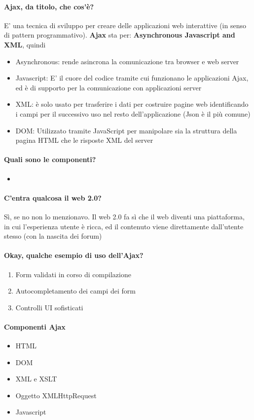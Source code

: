 \documentclass[12pt, a4paper, openany, twoside]{book}
\begin{document}
\paragraph{Ajax, da titolo, che cos'è?} E' una tecnica di sviluppo per creare
delle applicazioni web interattive (in senso di pattern programmativo).
\textbf{Ajax} sta per: \textbf{Asynchronous Javascript and XML}, quindi
\begin{itemize}
	\item Asynchronous: rende asincrona la comunicazione tra browser e web server
	\item Javascript: E' il cuore del codice tramite cui funzionano le applicazioni
	Ajax, ed è di supporto per la comunicazione con applicazioni server
	\item XML: è solo usato per trasferire i dati per costruire pagine web identificando
	i campi per il successivo uso nel resto dell'applicazione (Json è il più
	comune)
	\item DOM: Utilizzato tramite JavaScript per manipolare sia la struttura della 
	pagina HTML che le risposte XML del server
\end{itemize}
\paragraph{Quali sono le componenti?}
\begin{itemize}
	\item 
\end{itemize}
\paragraph{C'entra qualcosa il web 2.0?} Sì, se no non lo menzionavo. Il web
2.0 fa sì che il web diventi una piattaforma, in cui l'esperienza utente è ricca,
ed il contenuto viene direttamente dall'utente stesso (con la nascita dei forum)
\paragraph{Okay, qualche esempio di uso dell'Ajax?}
\begin{enumerate}
	\item Form validati in corso di compilazione
	\item Autocompletamento dei campi dei form
	\item Controlli UI sofisticati 
\end{enumerate}
\paragraph{Componenti Ajax}
\begin{itemize}
	\item HTML
	\item DOM
	\item XML e XSLT
	\item Oggetto XMLHttpRequest
	\item Javascript
\end{itemize}
\end{document}

